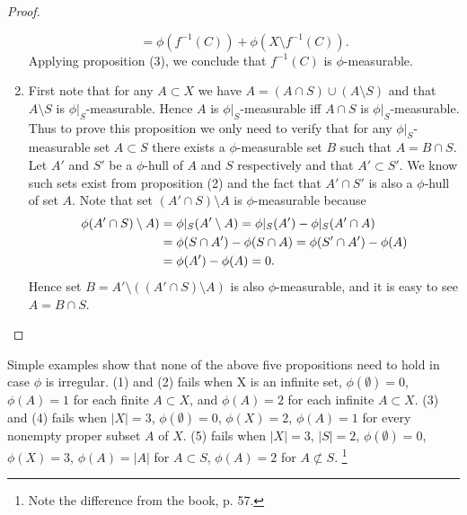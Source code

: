 \begin{proof}
\begin{enumerate}
\[      = \phi(f^{-1}(C)) + \phi(X\setminus f^{-1}(C)).
    \]
    Applying proposition (3), we conclude that $f^{-1}(C)$ is $\phi$-measurable.
  \item First note that for any $A\subset X$ we have 
    $A=(A\cap S)\cup(A\setminus S)$ and that $A\setminus S$ is 
    $\phi|_S$-measurable. Hence $A$ is $\phi|_S$-measurable iff $A\cap S$ is
    $\phi|_S$-measurable. Thus to prove this proposition we only need to verify 
    that for any $\phi|_S$-measurable set $A\subset S$ there exists a 
    $\phi$-measurable set $B$ such that $A=B\cap S$. Let $A'$ and $S'$ be a
    $\phi$-hull of $A$ and $S$ respectively and that $A'\subset S'$. We know 
    such sets exist from proposition (2) and the fact that $A'\cap S'$ is also 
    a $\phi$-hull of set $A$. Note that set $(A'\cap S)\setminus A$ is
    $\phi$-measurable because
    \begin{align*}
      \phi(A'\cap S)\setminus A) 
        &= \phi|_S(A'\setminus A) = \phi|_S(A') - \phi|_S(A'\cap A) \notag \\
        &= \phi(S\cap A') - \phi(S\cap A) = \phi(S'\cap A') - \phi(A) \notag \\
        &= \phi(A')-\phi(A)=0. \notag 
    \end{align*}
    Hence set $B=A'\setminus ((A'\cap S)\setminus A)$ is also $\phi$-measurable,
    and it is easy to see $A=B\cap S$.
\end{enumerate}
\end{proof}


\begin{remark} 
Simple examples show that none of the above five propositions need to hold in
case $\phi$ is irregular. (1) and (2) fails when X is an infinite set,
$\phi(\emptyset)=0$, $\phi(A)=1$ for each finite $A\subset X$, and $\phi(A)=2$
for each infinite $A\subset X$. (3) and (4) fails when $|X|=3$,
$\phi(\emptyset)=0$, $\phi(X)=2$, $\phi(A)=1$ for every nonempty proper subset
$A$ of $X$.  (5) fails when $|X|=3$, $|S|=2$, $\phi(\emptyset)=0$, $\phi(X)=3$, 
$\phi(A)=|A|$ for $A\subset S$, $\phi(A)=2$ for $A\not\subset S$.
\footnote{Note the difference from the book, p. 57.}
\end{remark}

